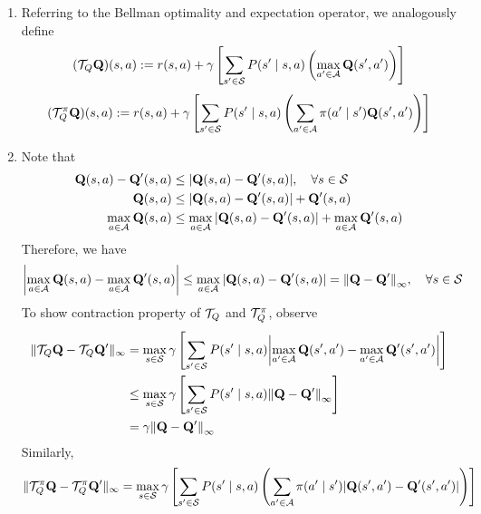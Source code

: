 \begin{Solution}
    \begin{enumerate} [label=\alph*)]
        \item
        Referring to the Bellman optimality and expectation operator, we analogously define
        $$
        (\ST_Q \mathbf{Q})(s,a) := r(s,a) + \gamma \left [ \sum_{s' \in \mathcal{S}} P(s' \mid s, a) \left (\max_{a' \in \mathcal{A}} \mathbf{Q}(s', a') \right ) \right ]
        $$
        $$
        (\ST_Q^{\pi} \mathbf{Q})(s,a) := r(s,a) + \gamma \left [ \sum_{s' \in \mathcal{S}} P(s' \mid s, a) \left (\sum_{a' \in \mathcal{A}} \pi(a' \mid s') \mathbf{Q}(s', a') \right ) \right ]
        $$
        \item
        Note that
        $$
        \begin{aligned}
        \mathbf{Q}(s,a) - \mathbf{Q}'(s,a) & \leq \abs{\mathbf{Q}(s,a) - \mathbf{Q}'(s,a)} , \quad \forall s \in \mathcal{S} \\
        \mathbf{Q}(s,a) & \leq \abs{\mathbf{Q}(s,a) - \mathbf{Q}'(s,a)} + \mathbf{Q}'(s,a) \\
        \max_{a \in \mathcal{A} } \mathbf{Q}(s,a) & \leq \max_{a \in \mathcal{A} } \abs{\mathbf{Q}(s,a) - \mathbf{Q}'(s,a)} + \max_{a \in \mathcal{A} } \mathbf{Q}'(s,a) \\
        \end{aligned}
        $$
        Therefore, we have
        $$
        \abs {\max_{a \in \mathcal{A} } \mathbf{Q}(s,a) - \max_{a \in \mathcal{A} }\mathbf{Q}'(s,a)} \le \max_{a \in \mathcal{A}} \abs{\mathbf{Q}(s,a) - \mathbf{Q}'(s,a)} = \norm{\mathbf{Q} - \mathbf{Q}'}_\infty, \quad \forall s \in \mathcal{S}
        $$
        To show contraction property of $\ST_Q$ and $\ST_Q^{\pi}$, observe
        $$
        \begin{aligned}
        \|\ST_Q \mathbf{Q} - \ST_Q\mathbf{Q}'\|_\infty & = \max_{s \in \mathcal{S}} \gamma \left [ \sum_{s' \in \mathcal{S}} P(s' \mid s, a) \abs{\max_{a' \in \mathcal{A}} \mathbf{Q}(s', a') - \max_{a' \in \mathcal{A}} \mathbf{Q}'(s', a') } \right ] \\
        & \leq \max_{s \in \mathcal{S}} \gamma \left [ \sum_{s' \in \mathcal{S}} P(s' \mid s, a) \norm{\mathbf{Q} - \mathbf{Q}'}_\infty \right ] \\
        & = \gamma \norm{\mathbf{Q} - \mathbf{Q}'}_\infty
        \end{aligned}
        $$
        Similarly,
        $$
        \begin{aligned}
        \|\ST_Q^{\pi} \mathbf{Q} - \ST_Q^{\pi}\mathbf{Q}'\|_\infty & = \max_{s \in \mathcal{S}} \gamma \left [ \sum_{s' \in \mathcal{S}} P(s' \mid s, a) \left (\sum_{a' \in \mathcal{A}} \pi(a' \mid s') \abs{\mathbf{Q}(s', a') - \mathbf{Q}'(s', a')} \right ) \right ] \\

\end{aligned}$$
\end{enumerate}
\end{Solution}
